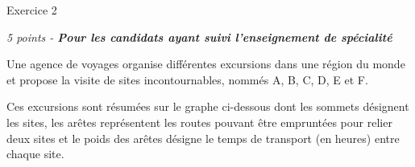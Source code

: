 
%
\begin{h2}Exercice 2\end{h2}
\textit{5 points - \textbf{Pour les candidats ayant suivi l'enseignement de spécialité}}
\par
Une agence de voyages organise différentes excursions dans une région du monde et propose la visite de sites incontournables, nommés A, B, C, D, E et F.
\par
Ces excursions sont résumées sur le graphe ci-dessous dont les sommets désignent les sites, les arêtes représentent les routes pouvant être empruntées pour relier deux sites et le poids des arêtes désigne le temps de transport (en heures) entre chaque site.

\begin{center}
\end{center}

